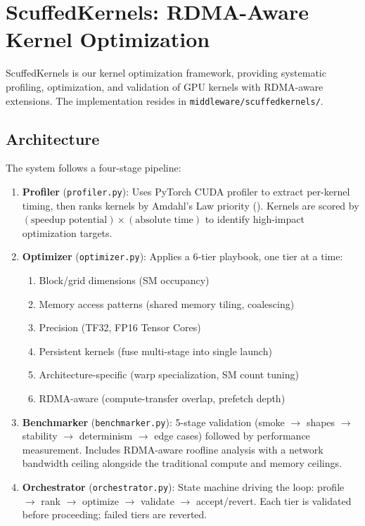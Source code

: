 \documentclass[11pt,letterpaper]{article}
\theoremstyle{definition}
\begin{document}
\section{ScuffedKernels: RDMA-Aware Kernel Optimization}
\label{sec:scuffedkernels}

ScuffedKernels is our kernel optimization framework, providing systematic profiling, optimization, and validation of GPU kernels with RDMA-aware extensions. The implementation resides in \texttt{middleware/scuffedkernels/}.

\subsection{Architecture}

The system follows a four-stage pipeline:

\begin{enumerate}
    \item \textbf{Profiler} (\texttt{profiler.py}): Uses PyTorch CUDA profiler to extract per-kernel timing, then ranks kernels by Amdahl's Law priority (). Kernels are scored by $(\text{speedup potential}) \times (\text{absolute time})$ to identify high-impact optimization targets.

    \item \textbf{Optimizer} (\texttt{optimizer.py}): Applies a 6-tier playbook, one tier at a time:
    \begin{enumerate}[label=T\arabic*:]
        \item Block/grid dimensions (SM occupancy)
        \item Memory access patterns (shared memory tiling, coalescing)
        \item Precision (TF32, FP16 Tensor Cores)
        \item Persistent kernels (fuse multi-stage into single launch)
        \item Architecture-specific (warp specialization, SM count tuning)
        \item RDMA-aware (compute-transfer overlap, prefetch depth)
    \end{enumerate}

    \item \textbf{Benchmarker} (\texttt{benchmarker.py}): 5-stage validation (smoke $\to$ shapes $\to$ stability $\to$ determinism $\to$ edge cases) followed by performance measurement. Includes RDMA-aware roofline analysis with a network bandwidth ceiling alongside the traditional compute and memory ceilings.

    \item \textbf{Orchestrator} (\texttt{orchestrator.py}): State machine driving the loop: profile $\to$ rank $\to$ optimize $\to$ validate $\to$ accept/revert. Each tier is validated before proceeding; failed tiers are reverted.
\end{enumerate}
\end{document}
